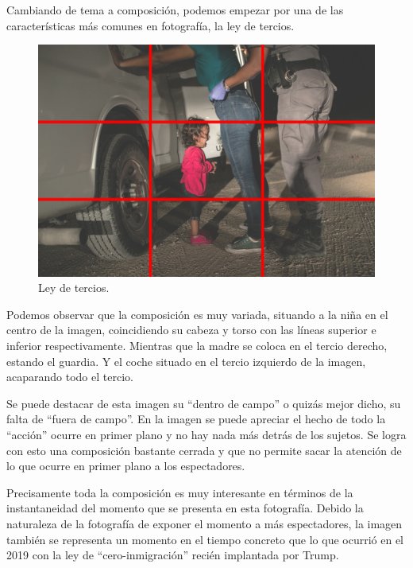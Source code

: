 \documentclass[11pt]{article}
\begin{document}
Cambiando de tema a composición, podemos empezar por una de las características más comunes en fotografía, la ley de tercios.
\begin{figure}[H]
	\includegraphics[scale = 0.5]{Images/rulethrids.png}
	\caption{Ley de tercios.}
	\label{fig:rulethrids}
\end{figure}

Podemos observar que la composición es muy variada, situando a la niña en el centro de la imagen, coincidiendo su cabeza y torso con las líneas superior e inferior respectivamente. Mientras que la madre se coloca en el tercio derecho, estando el guardia. Y el coche situado en el tercio izquierdo de la imagen, acaparando todo el tercio. \newline

Se puede destacar de esta imagen su “dentro de campo” o quizás mejor dicho, su falta de “fuera de campo”. En la imagen se puede apreciar el hecho de todo la “acción” ocurre en primer plano y no hay nada más detrás de los sujetos. Se logra con esto una composición bastante cerrada y que no permite sacar la atención de lo que ocurre en primer plano a los espectadores. \newline

Precisamente toda la composición es muy interesante en términos de la instantaneidad del momento que se presenta en esta fotografía. Debido la naturaleza de la fotografía de exponer el momento a más espectadores, la imagen también se representa un momento en el tiempo concreto que lo que ocurrió en el 2019 con la ley de “cero-inmigración” recién implantada por Trump. \newline

\end{document}
